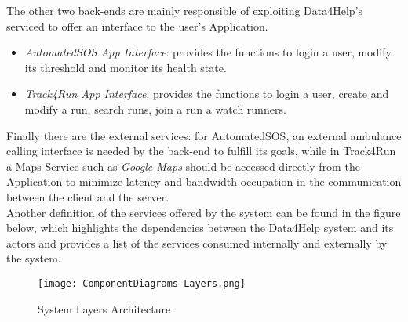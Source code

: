 The other two back-ends are mainly responsible of exploiting Data4Help's serviced to offer an interface to the user's Application. 

\begin{itemize}
	\item \textit{AutomatedSOS App Interface}: provides the functions to login a user, modify its threshold and monitor its health state.
	\item \textit{Track4Run App Interface}: provides the functions to login a user, create and modify a run, search runs, join a run a watch runners.
\end{itemize}

Finally there are the external services: for AutomatedSOS, an external ambulance calling interface is needed by the back-end to fulfill its goals, while in Track4Run a Maps Service such as \textit{Google Maps} should be accessed directly from the Application to minimize latency and bandwidth occupation in the communication between the client and the server.
\\

Another definition of the services offered by the system can be found in the figure below, which highlights the dependencies between the Data4Help system and its actors and provides a list of the services consumed internally and externally by the system.

\FloatBarrier
\begin{figure}[!h]
	\centering
	\texttt{[image: ComponentDiagrams-Layers.png]}
	\caption{System Layers Architecture}
\end{figure}
\FloatBarrier

